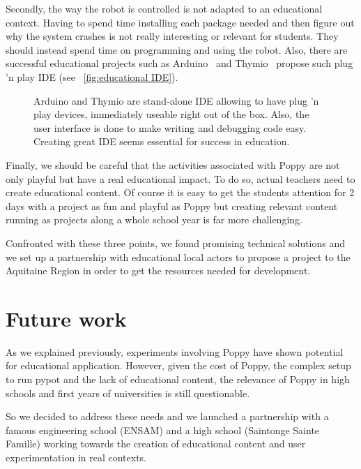 Secondly, the way   the robot is controlled is not adapted to an educational context. Having to spend time installing each package needed and then figure out why the system crashes is not really interesting or relevant for students. They should instead spend time on programming and using the robot. Also, there are successful educational projects such as Arduino~\parencite{banzi2009getting} and Thymio~\parencite{shin2014visual}  propose such plug 'n play IDE (see \figurename~\ref{fig:educational IDE}).

\begin{figure}[tb]
\centering
    \hfill
    \caption{Arduino and Thymio are stand-alone IDE allowing to have plug 'n play devices, immediately useable right out of the box. Also, the user interface is done to make writing and debugging code easy. Creating great IDE seems essential for success in education.}
    \label{fig:eductationnal IDE}
\end{figure}


Finally, we should be careful that the activities associated with Poppy are not only playful but have a real educational impact. To do so, actual teachers need to create educational content. Of course it is easy to get the students attention for 2 days with a project as fun and playful as Poppy but creating relevant content running as projects along a whole school year is far more challenging.

Confronted with these three points, we found promising technical solutions and we set up a partnership with educational local actors to propose a project to the Aquitaine Region in order to get the resources needed for development.


\section{Future work} %
\label{sec:education-future-work}

As we explained previously, experiments involving Poppy have shown potential for educational application. However, given the cost of Poppy, the complex setup to run pypot and the lack of educational content, the relevance of Poppy in high schools and first years of universities is still questionable.

So we decided to address these needs and we launched a partnership with a famous engineering school (ENSAM) and a high school (Saintonge Sainte Famille) working towards the creation of educational content and user experimentation in  real contexts.

